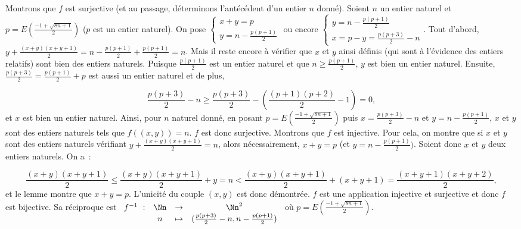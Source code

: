 {{Montrons que $f$ est surjective (et au passage, déterminons l'antécédent d'un entier $n$ donné).
Soient $n$ un entier naturel et $p=E\left(\frac{-1+\sqrt{8n+1}}{2}\right)$ ($p$ est un entier naturel). On pose $\left\{
\begin{array}{l}
x+y=p\\
y=n-\frac{p(p+1)}{2}
\end{array}
\right.$ ou encore $\left\{
\begin{array}{l}
y=n-\frac{p(p+1)}{2}\\
x=p-y=\frac{p(p+3)}{2}-n
\end{array}
\right.$. Tout d'abord, $y+\frac{(x+y)(x+y+1)}{2}=n-\frac{p(p+1)}{2}+\frac{p(p+1)}{2}=n$. Mais il reste encore à
vérifier que $x$ et $y$ ainsi définis (qui sont à l'évidence des entiers relatifs) sont bien des entiers
naturels. Puisque $\frac{p(p+1)}{2}$ est un entier naturel et que $n\geq\frac{p(p+1)}{2}$, $y$ est bien un entier
naturel. Ensuite, $\frac{p(p+3)}{2}=\frac{p(p+1)}{2}+p$ est aussi un entier naturel et de plus,

$$\frac{p(p+3)}{2}-n\geq\frac{p(p+3)}{2}-\left(\frac{(p+1)(p+2)}{2}-1\right)=0,$$
et $x$ est bien un entier naturel. Ainsi, pour $n$ naturel donné, en posant $p= E\left(\frac{-1+\sqrt{8n+1}}{2}\right)$ puis
$x=\frac{p(p+3)}{2}-n$ et $y=n-\frac{p(p+1)}{2}$, $x$ et $y$ sont des entiers naturels tels que $f((x,y))=n$. $f$ est
donc surjective.
Montrons que $f$ est injective.
Pour cela, on montre que si $x$ et $y$ sont des entiers naturels vérifiant
$y+\frac{(x+y)(x+y+1)}{2}=n$, alors nécessairement, $x+y=p$ (et $y=n-\frac{p(p+1)}{2})$.
Soient donc $x$ et $y$ deux entiers naturels. On a~:

$$\frac{(x+y)(x+y+1)}{2}\leq\frac{(x+y)(x+y+1)}{2}+y=n<\frac{(x+y)(x+y+1)}{2}+(x+y+1)=\frac{(x+y+1)(x+y+2)}{2},$$
et le lemme montre que $x+y=p$. L'unicité du couple $(x,y)$ est donc démontrée. $f$ est une application injective et
surjective et donc $f$ est bijective. Sa réciproque est $\begin{array}[t]{cccc}
f^{-1}~:&\Nn&\rightarrow&\Nn^2\\
 &n&\mapsto&(\frac{p(p+3)}{2}-n,n-\frac{p(p+1)}{2})
\end{array}$ où $p=E\left(\frac{-1+\sqrt{8n+1}}{2}\right)$.}
}